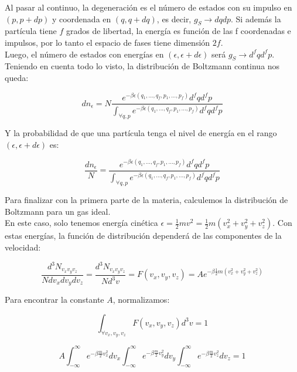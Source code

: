 \documentclass[a4paper]{article}
\begin{document}
Al pasar al continuo, la degeneraci\'on es el n\'umero de estados con su impulso en $(p, p + dp)$ y coordenada en $(q, q + dq)$, es decir, $g_{S} \rightarrow dqdp$. Si adem\'as la part\'icula tiene $f$ grados de libertad, la energ\'ia es funci\'on de las f coordenadas e impulsos, por lo tanto el espacio de fases tiene dimensi\'on $2f$.\\

Luego, el n\'umero de estados con energ\'ias en $(\epsilon, \epsilon + d\epsilon)$ ser\'a $g_{S} \rightarrow d^{f}qd^{f}p$. Teniendo en cuenta todo lo visto, la distribuci\'on de Boltzmann continua nos queda:

\begin{equation}
\label{eq:boltzmannc}
dn_{\epsilon} = N\frac{e^{-\beta \epsilon(q_{1},..., q_{f},p_{1},...,p_{f})}d^{f}qd^{f}p}{\int_{\forall q, p}e^{-\beta \epsilon(q_{1},..., q_{f},p_{1},...,p_{f})}d^{f}qd^{f}p}
\end{equation}

Y la probabilidad de que una part\'icula tenga el nivel de energ\'ia en el rango $(\epsilon, \epsilon + d\epsilon)$ es:

\begin{equation}
\label{eq:probaboltzmannc}
\frac{dn_{\epsilon}}{N} = \frac{e^{-\beta \epsilon(q_{1},..., q_{f},p_{1},...,p_{f})}d^{f}qd^{f}p}{\int_{\forall q, p}e^{-\beta \epsilon(q_{1},..., q_{f},p_{1},...,p_{f})}d^{f}qd^{f}p} 
\end{equation}

Para finalizar con la primera parte de la materia, calculemos la distribuci\'on de Boltzmann para un gas ideal.\\

En este caso, solo tenemos energ\'ia cin\'etica $\epsilon = \frac{1}{2}mv^{2} = \frac{1}{2}m(v_{x}^{2} + v_{y}^{2} + v_{z}^{2})$. Con estas energ\'ias, la funci\'on de distribuci\'on depender\'a de las componentes de la velocidad:

$$\frac{d^{3}N_{v_{x}v_{y}v_{z}}}{Ndv_{x}dv_{y}dv_{z}} = \frac{d^{3}N_{v_{x}v_{y}v_{z}}}{Nd^{3}v} = F(v_{x},v_{y},v_{z}) = Ae^{-\beta \frac{1}{2}m(v_{x}^{2} + v_{y}^{2} + v_{z}^{2})}$$

Para encontrar la constante $A$, normalizamos:

$$\int_{\forall v_{x},v_{y},v_{z}} F(v_{x},v_{y},v_{z})d^{3}v = 1$$

$$A\int_{-\infty}^{\infty}e^{-\beta \frac{m}{2}v_{x}^{2}}dv_{x}\int_{-\infty}^{\infty}e^{-\beta \frac{m}{2}v_{y}^{2}}dv_{y}\int_{-\infty}^{\infty}e^{-\beta \frac{m}{2}v_{z}^{2}}dv_{z} = 1$$
\end{document}
